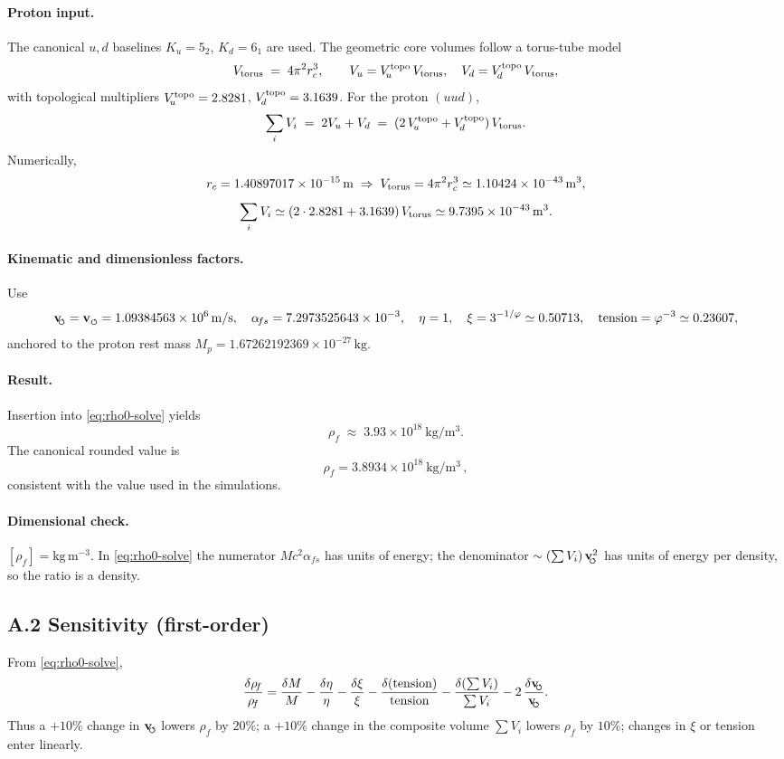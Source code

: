 \documentclass[11pt, preprint,titlepage]{revtex4-2}
\newcommand{\rhoF}{\rho_{\!f}}      %
\newcommand{\swirlarrow}{\!\!\scriptsize\boldsymbol{\circlearrowleft}}
\newcommand{\vswirl}{\mathbf{v}_{\swirlarrow}}
\begin{document}
	\paragraph{Proton input.}
	The canonical \(u,d\) baselines \(K_u=5_2\), \(K_d=6_1\) are used.
	The geometric core volumes follow a torus-tube model
	\[
		V_{\rm torus} \;=\; 4\pi^2 r_c^3,\qquad
		V_u = V_{\!u}^{\rm topo}\,V_{\rm torus},\quad V_d = V_{\!d}^{\rm topo}\,V_{\rm torus},
	\]
	with topological multipliers
	\(V_{\!u}^{\rm topo}=2.8281\), \(V_{\!d}^{\rm topo}=3.1639\).
	For the proton \((uud)\),
	\[
		\sum_i V_i \;=\; 2V_u + V_d \;=\; (2\,V_{\!u}^{\rm topo}+V_{\!d}^{\rm topo})\,V_{\rm torus}.
	\]
	Numerically,
	\[
		r_c = 1.40897017\times 10^{-15}\,\mathrm{m}
		\;\Rightarrow\;
		V_{\rm torus} = 4\pi^2 r_c^3 \simeq 1.10424\times10^{-43}\,\mathrm{m^3},
	\]
	\[
		\sum_i V_i \simeq (2\cdot 2.8281 + 3.1639)\,V_{\rm torus}
		\simeq 9.7395\times 10^{-43}\,\mathrm{m^3}.
	\]

	\paragraph{Kinematic and dimensionless factors.}
	Use
	\[
		\vswirl = \mathbf{v}_{\scriptscriptstyle\boldsymbol{\circlearrowleft}} = 1.09384563\times10^6\,\mathrm{m/s},\quad
		\alpha_{\!fs}=7.2973525643\times10^{-3},\quad
		\eta=1,\quad \xi = 3^{-1/\varphi}\simeq 0.50713,\quad
		\text{tension} = \varphi^{-3} \simeq 0.23607,
	\]
	anchored to the proton rest mass \(M_p=1.67262192369\times10^{-27}\,\mathrm{kg}\).

	\paragraph{Result.}
	Insertion into \eqref{eq:rho0-solve} yields
	\[
		\rhoF \;\approx\; 3.93\times 10^{18}\ \mathrm{kg/m^3}.
	\]
	The canonical rounded value is
	\[
		\boxed{ \rhoF = 3.8934\times 10^{18}\ \mathrm{kg/m^3} }\,,
	\]
	consistent with the value used in the simulations.

	\paragraph{Dimensional check.}
	\([\rhoF]=\mathrm{kg\,m^{-3}}\).
	In \eqref{eq:rho0-solve} the numerator \(M c^2\alpha_{\!fs}\) has units of energy; the denominator
	\(\sim (\sum V_i)\,\vswirl^{2}\) has units of energy per density, so the ratio is a density.

	\subsection*{A.2 Sensitivity (first-order)}
	From \eqref{eq:rho0-solve},
	\[
		\frac{\delta\rhoF}{\rhoF}
		= \frac{\delta M}{M}
		- \frac{\delta\eta}{\eta}
		- \frac{\delta\xi}{\xi}
		- \frac{\delta(\text{tension})}{\text{tension}}
		- \frac{\delta(\sum V_i)}{\sum V_i}
		- 2\,\frac{\delta \vswirl}{\vswirl}.
	\]
	Thus a \(+10\%\) change in \(\vswirl\) lowers \(\rhoF\) by \(20\%\); a \(+10\%\) change in the composite volume \(\sum V_i\) lowers \(\rhoF\) by \(10\%\); changes in \(\xi\) or tension enter linearly.
\end{document}
